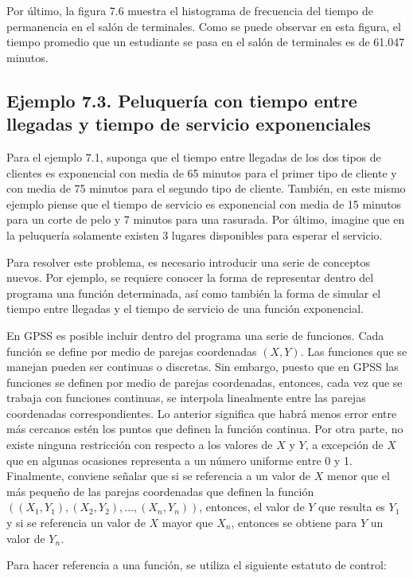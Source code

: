 \documentclass[11pt,letterpaper]{report}
\begin{document}
Por último, la figura 7.6 muestra el histograma de frecuencia del
tiempo de permanencia en el salón de terminales. Como se puede observar
en esta figura, el tiempo promedio que un estudiante se pasa en el
salón de terminales es de 61.047 minutos.

\subsection*{Ejemplo 7.3. Peluquería con tiempo entre llegadas y tiempo de servicio exponenciales}

Para el ejemplo 7.1, suponga que el tiempo entre llegadas de los dos
tipos de clientes es exponencial con media de 65 minutos para el primer
tipo de cliente y con media de 75 minutos para el segundo tipo de
cliente. También, en este mismo ejemplo piense que el tiempo de servicio
es exponencial con media de 15 minutos para un corte de pelo y 7 minutos
para una rasurada. Por último, imagine que en la peluquería solamente
existen 3 lugares disponibles para esperar el servicio.

Para resolver este problema, es necesario introducir una serie de
conceptos nuevos. Por ejemplo, se requiere conocer la forma de
representar dentro del programa una función determinada, así como
también la forma de simular el tiempo entre llegadas y el tiempo de
servicio de una función exponencial.

En GPSS es posible incluir dentro del programa una serie de funciones.
Cada función se define por medio de parejas coordenadas $(X,Y)$. Las
funciones que se manejan pueden ser continuas o discretas. Sin embargo,
puesto que en GPSS las funciones se definen por medio de parejas
coordenadas, entonces, cada vez que se trabaja con funciones continuas,
se interpola linealmente entre las parejas coordenadas correspondientes.
Lo anterior significa que habrá menos error entre más cercanos estén los
puntos que definen la función continua. Por otra parte, no existe
ninguna restricción con respecto a los valores de $X$ y $Y$, a
excepción de $X$ que en algunas ocasiones representa a un número
uniforme entre 0 y 1. Finalmente, conviene señalar que si se referencia
a un valor de $X$ menor que el más pequeño de las parejas coordenadas
que definen la función $((X_1,Y_1),(X_2,Y_2),\ldots,(X_n,Y_n))$,
entonces, el valor de $Y$ que resulta es $Y_1$ y si se referencia un
valor de $X$ mayor que $X_n$, entonces se obtiene para $Y$ un valor de
$Y_n$.

Para hacer referencia a una función, se utiliza el siguiente estatuto de
control:
\end{document}
